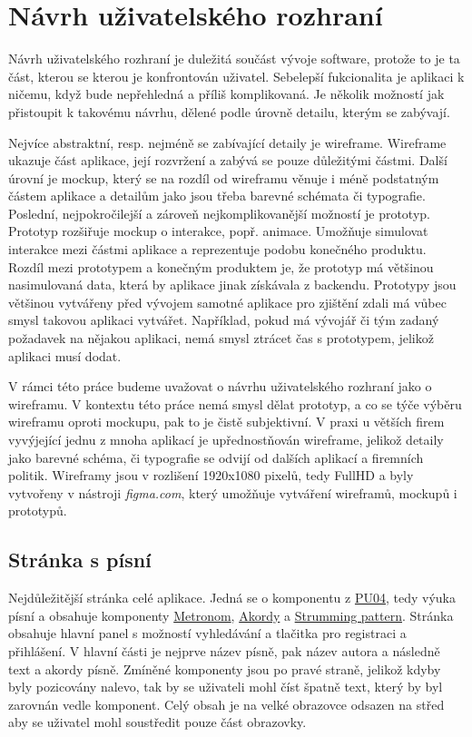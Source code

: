 \section{Návrh uživatelského rozhraní}
\label{sc:wireframes}
Návrh uživatelského rozhraní je duležitá součást vývoje software, protože to je ta část, kterou se kterou je konfrontován uživatel. Sebelepší fukcionalita je aplikaci k ničemu, když bude nepřehledná a příliš komplikovaná. Je několik možností jak přistoupit k takovému návrhu, dělené podle úrovně detailu, kterým se zabývají.

Nejvíce abstraktní, resp. nejméně se zabívající detaily je wireframe. Wireframe ukazuje část aplikace, její rozvržení a zabývá se pouze důležitými částmi. Další úrovní je mockup, který se na rozdíl od wireframu věnuje i méně podstatným částem aplikace a detailům jako jsou třeba barevné schémata či typografie. Poslední, nejpokročilejší a zároveň nejkomplikovanější možností je prototyp. Prototyp rozšiřuje mockup o interakce, popř. animace. Umožňuje simulovat interakce mezi částmi aplikace a reprezentuje podobu konečného produktu. Rozdíl mezi prototypem a konečným produktem je, že prototyp má většinou nasimulovaná data, která by aplikace jinak získávala z backendu. Prototypy jsou většinou vytvářeny před vývojem samotné aplikace pro zjištění zdali má vůbec smysl takovou aplikaci vytvářet. Například, pokud má vývojář či tým zadaný požadavek na nějakou aplikaci, nemá smysl ztrácet čas s prototypem, jelikož aplikaci musí dodat.

V rámci této práce budeme uvažovat o návrhu uživatelského rozhraní jako o wireframu. V kontextu této práce nemá smysl dělat prototyp, a co se týče výběru wireframu oproti mockupu, pak to je čistě subjektivní. V praxi u větších firem vyvýjející jednu z mnoha aplikací je upřednostňován wireframe, jelikož detaily jako barevné schéma, či typografie se odvijí od dalších aplikací a firemních politik. Wireframy jsou v rozlišení 1920x1080 pixelů, tedy FullHD a byly vytvořeny v nástroji \emph{figma.com}, který umožňuje vytváření wireframů, mockupů i prototypů.

\subsection{Stránka s písní}
\label{ss:wireframe_song}
Nejdůležitější stránka celé aplikace. Jedná se o komponentu z \hyperref[uc04]{PU04}, tedy výuka písní a obsahuje komponenty \hyperref[uc1]{Metronom}, \hyperref[uc2]{Akordy} a \hyperref[uc3]{Strumming pattern}. Stránka obsahuje hlavní panel s možností vyhledávání a tlačitka pro registraci a přihlášení. V hlavní části je nejprve název písně, pak název autora a následně text a akordy písně. Zmíněné komponenty jsou po pravé straně, jelikož kdyby byly pozicovány nalevo, tak by se uživateli mohl číst špatně text, který by byl zarovnán vedle komponent. Celý obsah je na velké obrazovce odsazen na střed aby se uživatel mohl soustředit pouze část obrazovky.

